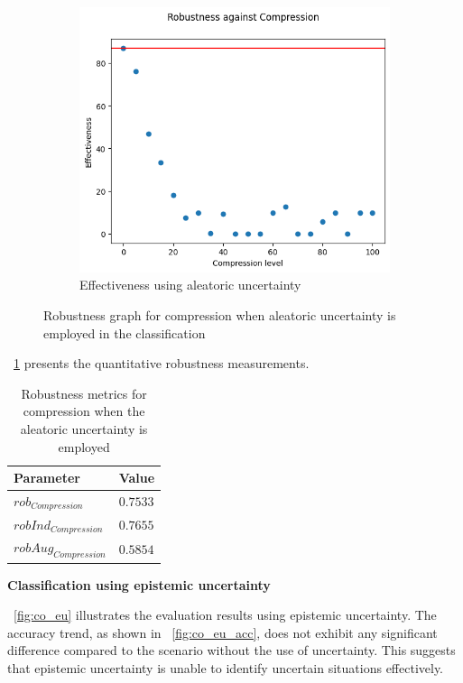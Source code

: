 \begin{figure}[H]
\begin{subfigure}{.33\textwidth}
		\centering
		\includegraphics[width=0.9\linewidth]{ImageFiles/EvalBNN/CO/AU/eff}
		\caption{Effectiveness using aleatoric uncertainty}
		\label{fig:co_au_eff}
	\end{subfigure}
	\caption{Robustness graph for compression when aleatoric uncertainty is employed in the classification}
	\label{fig:co_au}
\end{figure}

\Tab~\ref{table:rob_co_au} presents the quantitative robustness measurements.
\begin{table}[h]
	\centering
	\begin{tabular}{|| l | l ||} 
		\hline
		\textbf{Parameter} & \textbf{Value} \\
		\hline
		\hline
		$rob_{Compression}$ & $0.7533$ \\
		$robInd_{Compression}$ & $0.7655$ \\
		$robAug_{Compression}$ & $0.5854$ \\	
		\hline
	\end{tabular}	
	\caption{Robustness metrics for compression when the aleatoric uncertainty is employed}
	\label{table:rob_co_au}
\end{table}

\vspace{0.3cm}
\textbf{Classification using epistemic uncertainty}
\vspace{0.1cm}

\Fig~\ref{fig:co_eu} illustrates the evaluation results using epistemic uncertainty. The accuracy trend, as shown in \Fig~\ref{fig:co_eu_acc}, does not exhibit any significant difference compared to the scenario without the use of uncertainty. This suggests that epistemic uncertainty is unable to identify uncertain situations effectively.

